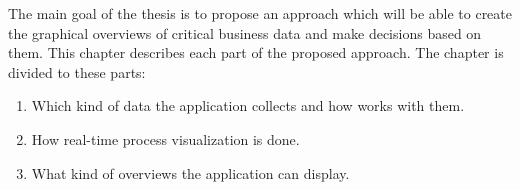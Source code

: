 
The main goal of the thesis is to propose an approach which will be able to create the graphical overviews of critical business data and make decisions based on them. This chapter describes each part of the proposed approach. The chapter is divided to these parts:	
    \begin{enumerate}
      \item Which kind of data the application collects and how works with them.
      \item How real-time process visualization is done.
      \item What kind of overviews the application can display. 
    \end{enumerate}
    
